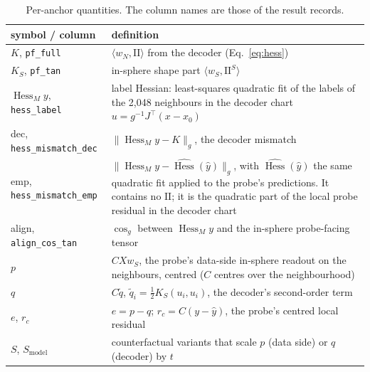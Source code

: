 \documentclass[10pt]{article}
\newcommand{\norm}[1]{\lVert #1 \rVert}
\newcommand{\II}{\mathrm{II}}
\newcommand{\Hess}{\operatorname{Hess}_M}
\newcommand{\Smodel}{S_{\mathrm{model}}}
\begin{document}
\begin{table}[t]
\centering\small
\begin{tabular}{p{}p{}}
\toprule
symbol / column & definition \\
\midrule
$K$, \texttt{pf\_full} & $\langle w_N,\II\rangle$ from the decoder (Eq.~\ref{eq:hess}) \\
$K_S$, \texttt{pf\_tan} & in-sphere shape part $\langle w_S,\II^S\rangle$ \\
$\Hess y$, \texttt{hess\_label} & label Hessian: least-squares quadratic fit of the labels of the 2{,}048 neighbours in the decoder chart $u=g^{-1}J^\top(x-x_0)$ \\
dec, \texttt{hess\_mismatch\_dec} & $\norm{\Hess y-K}_g$, the decoder mismatch \\
emp, \texttt{hess\_mismatch\_emp} & $\norm{\Hess y-\widehat{\operatorname{Hess}}(\hat y)}_g$, with $\widehat{\operatorname{Hess}}(\hat y)$ the same quadratic fit applied to the probe's predictions. It contains no $\II$; it is the quadratic part of the local probe residual in the decoder chart \\
align, \texttt{align\_cos\_tan} & $\cos_g$ between $\Hess y$ and the in-sphere probe-facing tensor \\
$p$ & $CXw_S$, the probe's data-side in-sphere readout on the neighbours, centred ($C$ centres over the neighbourhood) \\
$q$ & $C\tilde q$, $\tilde q_i=\tfrac12K_S(u_i,u_i)$, the decoder's second-order term \\
$e$, $r_c$ & $e=p-q$; $r_c=C(y-\hat y)$, the probe's centred local residual \\
$S$, $\Smodel$ & counterfactual variants that scale $p$ (data side) or $q$ (decoder) by $t$ \\
\bottomrule
\end{tabular}
\caption{Per-anchor quantities. The column names are those of the result records.}
\label{tab:notation}
\end{table}
\end{document}
